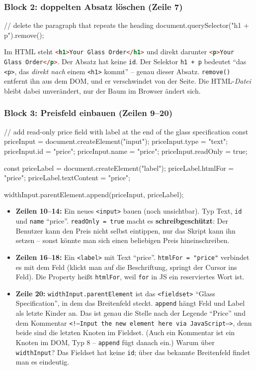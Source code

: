 \documentclass[a4paper,11pt]{article}
\begin{document}
\subsubsection*{Block 2: doppelten Absatz löschen (Zeile 7)}
\begin{code}[firstnumber=6]
// delete the paragraph that repeats the heading
document.querySelector("h1 + p").remove();
\end{code}
Im HTML steht \lstinline[language=HTML]|<h1>Your Glass Order</h1>| und direkt darunter
\lstinline[language=HTML]|<p>Your Glass Order</p>|. Der Absatz hat keine \texttt{id}. Der Selektor \texttt{h1 + p}
bedeutet "`das \texttt{<p>}, das \emph{direkt nach} einem \texttt{<h1>} kommt"' -- genau dieser Absatz.
\texttt{remove()} entfernt ihn aus dem DOM, und er verschwindet von der Seite. Die HTML-\emph{Datei} bleibt dabei
unverändert, nur der Baum im Browser ändert sich.

\subsubsection*{Block 3: Preisfeld einbauen (Zeilen 9--20)}
\begin{code}[firstnumber=9]
// add read-only price field with label at the end of the glass specification
const priceInput = document.createElement("input");
priceInput.type = "text";
priceInput.id = "price";
priceInput.name = "price";
priceInput.readOnly = true;

const priceLabel = document.createElement("label");
priceLabel.htmlFor = "price";
priceLabel.textContent = "price";

widthInput.parentElement.append(priceInput, priceLabel);
\end{code}
\begin{itemize}
\item \textbf{Zeilen 10--14:} Ein neues \texttt{<input>} bauen (noch unsichtbar). Typ Text, \texttt{id} und
      \texttt{name} "`price"'. \lstinline|readOnly = true| macht es \textbf{schreibgeschützt}: Der Benutzer kann den
      Preis nicht selbst eintippen, nur das Skript kann ihn setzen -- sonst könnte man sich einen beliebigen
      Preis hineinschreiben.
\item \textbf{Zeilen 16--18:} Ein \texttt{<label>} mit Text "`price"'. \lstinline|htmlFor = "price"| verbindet es mit
      dem Feld (klickt man auf die Beschriftung, springt der Cursor ins Feld). Die Property heißt \texttt{htmlFor},
      weil \texttt{for} in JS ein reserviertes Wort ist.
\item \textbf{Zeile 20:} \lstinline|widthInput.parentElement| ist das \texttt{<fieldset>} "`Glass Specification"', in dem
      das Breitenfeld steckt. \texttt{append} hängt Feld und Label als letzte Kinder an. Das ist genau die Stelle
      nach der Legende "`Price"' und dem Kommentar \texttt{<!--Input the new element here via JavaScript-->}, denn
      beide sind die letzten Knoten im Fieldset. (Auch ein Kommentar ist ein Knoten im DOM, Typ 8 -- \texttt{append}
      fügt danach ein.) Warum über \texttt{widthInput}? Das Fieldset hat keine \texttt{id}; über das bekannte
      Breitenfeld findet man es eindeutig.
\end{itemize}
\end{document}
